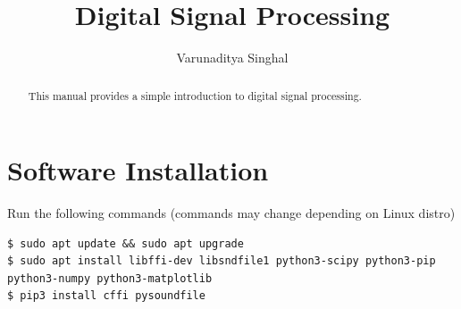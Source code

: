 \documentclass[journal,12pt,twocolumn]{IEEEtran}
\renewcommand\thesection{\arabic{section}}
\begin{document}
\renewcommand{\thefigure}{\arabic{section}.\arabic{figure}}
\makeatletter
{}
\makeatother

\def\putbox#1#2#3{\makebox[0in][l]{\makebox[#1][l]{}\raisebox{\baselineskip}[0in][0in]{\raisebox{#2}[0in][0in]{#3}}}}
     \def\rightbox#1{\makebox[0in][r]{#1}}
     \def\centbox#1{\makebox[0in]{#1}}
     \def\topbox#1{\raisebox{-\baselineskip}[0in][0in]{#1}}
     \def\midbox#1{\raisebox{-0.5\baselineskip}[0in][0in]{#1}}

\vspace{3cm}

\title{Digital Signal Processing}

\author{Varunaditya Singhal} 

\maketitle


\tableofcontents





\bigskip

\begin{abstract}
This manual provides a simple introduction to digital signal processing.
\end{abstract}
\noindent \section{Software Installation}
\noindent Run the following commands (commands may change depending on Linux distro)
\begin{lstlisting}
$ sudo apt update && sudo apt upgrade
$ sudo apt install libffi-dev libsndfile1 python3-scipy python3-pip python3-numpy python3-matplotlib 
$ pip3 install cffi pysoundfile 
\end{lstlisting}
\end{document}

